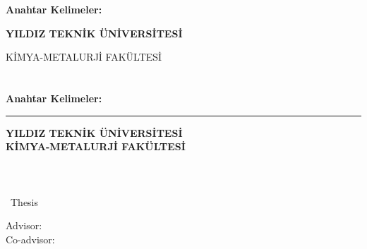 \abstractTextTurkish

{\bfseries Anahtar Kelimeler:} \abstractKeywordsTurkish

\vfill


\noindent
\rlap{\rule[2.5ex]{\textwidth}{.1pt}}
{\bfseries \small
 \hfill{}YILDIZ TEKNİK ÜNİVERSİTESİ\\
 \strut\hfill{}KİMYA-METALURJİ FAKÜLTESİ
}

\else
\newpage
\chapter*{\tabstract}

\begin{center}
{\bfseries \Large\titleTR}




\end{center}

\abstractTextTurkish

{\bfseries Anahtar Kelimeler:} \abstractKeywordsTurkish

\vfill


\begin{center}
\rule{0.99\textwidth}{.1pt}

\bfseries \small
 YILDIZ TEKNİK ÜNİVERSİTESİ\\
 KİMYA-METALURJİ FAKÜLTESİ
\end{center}

\newpage
\chapter*{\eabstract}

\begin{center}
{\bfseries \Large\titleEN}

\student

\departmentEN \\ {\degree~Thesis}

Advisor: \advisorEN \\
Co-advisor: \coadvisorEN

\end{center}

